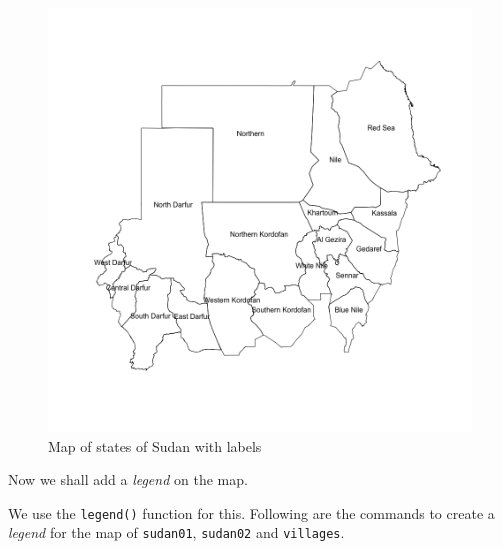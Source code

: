 \documentclass[12pt,a4paper,a4paper]{book}
\theoremstyle{definition}
\theoremstyle{definition}
\theoremstyle{definition}
\theoremstyle{remark}
\begin{document}
\begin{figure}[H]

{\centering \includegraphics{figures/map6-1} 

}

\caption{Map of states of Sudan with labels}\label{fig:map6}
\end{figure}

\newpage

Now we shall add a \emph{legend} on the map.

We use the \texttt{legend()} function for this. Following are the
commands to create a \emph{legend} for the map of \texttt{sudan01},
\texttt{sudan02} and \texttt{villages}.

~
\end{document}
